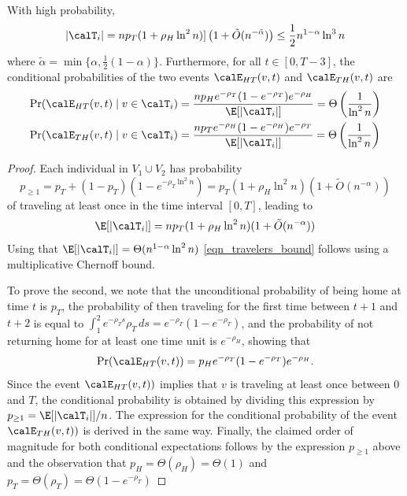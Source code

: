 \documentclass[11pt]{article}
\begin{document}
\begin{lemma}\label{lem:few-travelers}
With high probability, 
\begin{equation}
    \label{eqn_travelers_bound}|
    {\calT_i}|
    =np_T(1+\rho_H\ln^2 n)]\left(1+\tilde O(n^{-\tilde\alpha})\right)
    \leq \frac 12n^{1-\alpha}\ln^3 n
    \end{equation}
    where $\tilde\alpha=\min\big\{\alpha,\frac 12(1-\alpha)\big\}$.  
Furthermore, for all $t\in [0,T-3]$, the  conditional probabilities of the two events  $\calE_{HT}(v,t)$ and  $\calE_{TH}(v,t)$ are
\begin{align}
    \Pr(\calE_{HT}(v,t)\mid v\in\calT_i)
    &=\frac {n p_He^{-\rho_T}(1-e^{-\rho_T})e^{-\rho_H}}{\E[|\calT_i|]}=\Theta\left(\frac 1{\ln^2n}\right)
\\
    \Pr(\calE_{TH}(v,t)\mid v\in\calT_i)
    &=\frac {np_Te^{-\rho_H}(1-e^{-\rho_H})e^{-\rho_T}}{\E[|\calT_i|]}=\Theta\left(\frac 1{\ln^2n}\right)
\end{align}
 \end{lemma}
\begin{proof}
Each individual in $V_1\cup V_2$ has probability
    \begin{equation}
p_{\geq 1}=p_T+(1-p_T)(1-e^{-\rho_T \ln^2 n})=p_T(1+ \rho_H\ln^2 n)(1+\tilde O(n^{-\alpha}))
\end{equation}   
of traveling at least once in the time interval $[0,T]$, leading to 
$$
\E[|\calT_i|]= np_T(1+\rho_H\ln^2n)(1+\tilde O(n^{-\alpha}))
$$
Using that $\E[|\calT_i|]= \Theta(n^{1-\alpha}\ln^2n)$
\eqref{eqn_travelers_bound} follows using a  multiplicative Chernoff  bound.

To prove the second, we note that the unconditional probability of being home at time $t$ is $p_T$, the probability of then traveling for the first time between $t+1$ and $t+2$ is equal to $\int_1^2e^{-\rho_Ts}\rho_T \, ds=e^{-\rho_T}(1-e^{-\rho_T})$, and the probability of not returning home for at least one time unit is $e^{-\rho_H}$, showing that
\[  
  \Pr(\calE_{HT}(v,t))= p_He^{-\rho_T}(1-e^{-\rho_T})e^{-\rho_H}.
\]
Since the event $\calE_{HT}(v,t))$ implies that $v$ is traveling at least once between $0$ and $T$, the conditional probability is obtained by dividing this expression by 
$p_{\geq 1}=\E[|\calT_i|]/n$.  The  expression for the conditional probability of the event  $\calE_{TH}(v,t))$ is derived in the same way.  Finally, the claimed order of magnitude for both conditional expectations follows by the expression $p_{\geq 1}$ above and the observation that
$p_H=\Theta( \rho_H)=\Theta(1)$ and $p_T=\Theta(\rho_T)=\Theta (1-e^{-\rho_T})$
\end{proof}
\end{document}
